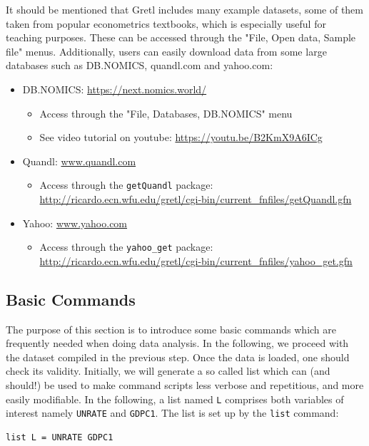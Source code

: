 \documentclass[11pt]{article}
\begin{document}
It should be mentioned that Gretl includes many example datasets, some of them taken from popular econometrics textbooks, which is especially useful for teaching purposes. These can be accessed through the "File, Open data, Sample file" menus. Additionally, users can easily download data from some large databases such as DB.NOMICS, quandl.com and yahoo.com:
\begin{itemize}
	\item DB.NOMICS: \url{https://next.nomics.world/}
	\begin{itemize}
		\item Access through the "File, Databases, DB.NOMICS" menu
		\item See video tutorial on youtube: \url{https://youtu.be/B2KmX9A6ICg}
	\end{itemize}
	\item Quandl: \url{www.quandl.com}
	\begin{itemize}
		\item Access through the \texttt{getQuandl} package: \url{http://ricardo.ecn.wfu.edu/gretl/cgi-bin/current_fnfiles/getQuandl.gfn}		
	\end{itemize}
	\item Yahoo: \url{www.yahoo.com}
	\begin{itemize}
		\item Access through the \texttt{yahoo\_get} package: \url{http://ricardo.ecn.wfu.edu/gretl/cgi-bin/current_fnfiles/yahoo_get.gfn}
	\end{itemize}
\end{itemize}



\subsection{Basic Commands}
The purpose of this section is to introduce some basic commands which are frequently needed when doing data analysis. In the following, we proceed with the dataset compiled in the previous step. Once the data is loaded, one should check its validity. %
Initially, we will generate a so called list which can (and should!) be used to make command scripts less verbose and repetitious, and more easily modifiable. In the following, a list named \texttt{L} comprises both variables of interest namely \texttt{UNRATE} and \texttt{GDPC1}. The list is set up by the \texttt{list} command:
\begin{Verbatim}[baselinestretch=0.75, fontsize=\small]
list L = UNRATE GDPC1
\end{Verbatim}
\end{document}
